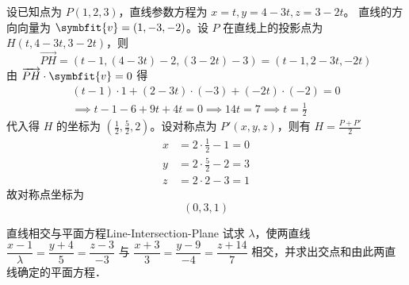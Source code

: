 \begin{solution}
    设已知点为 $P(1, 2, 3)$，直线参数方程为 $x = t, y = 4 - 3t, z = 3 - 2t$。
    直线的方向向量为 $\symbfit{v} = (1, -3, -2)$。设 $P$ 在直线上的投影点为 $H(t, 4 - 3t, 3 - 2t)$，则
    \begin{equation}
        \overrightarrow{PH} = (t - 1, (4 - 3t) - 2, (3 - 2t) - 3) = (t - 1, 2 - 3t, -2t)
    \end{equation}
    由 $\overrightarrow{PH} \cdot \symbfit{v} = 0$ 得
    \begin{equation}
        \begin{aligned}
            (t - 1) \cdot 1 + (2 - 3t) \cdot (-3) + (-2t) \cdot (-2) = 0 \\
            \implies t - 1 - 6 + 9t + 4t = 0 \implies 14t = 7 \implies t = \frac{1}{2}
        \end{aligned}
    \end{equation}
    代入得 $H$ 的坐标为 $\left( \frac{1}{2}, \frac{5}{2}, 2 \right)$。设对称点为 $P'(x, y, z)$，则有 $H = \frac{P + P'}{2}$
    \begin{equation}
        \begin{aligned}
            x & = 2 \cdot \frac{1}{2} - 1 = 0 \\
            y & = 2 \cdot \frac{5}{2} - 2 = 3 \\
            z & = 2 \cdot 2 - 3 = 1
        \end{aligned}
    \end{equation}
    故对称点坐标为
    \begin{equation}
        \boxed{(0, 3, 1)}
    \end{equation}
\end{solution}


\begin{problem}{直线相交与平面方程}{Line-Intersection-Plane}
    试求 $\lambda$，使两直线 $\dfrac{x - 1}{\lambda} = \dfrac{y + 4}{5} = \dfrac{z - 3}{-3}$ 与 $\dfrac{x + 3}{3} = \dfrac{y - 9}{-4} = \dfrac{z + 14}{7}$ 相交，并求出交点和由此两直线确定的平面方程．
\end{problem}

